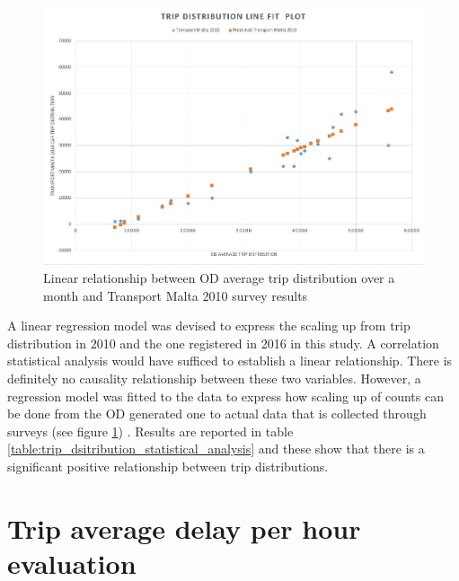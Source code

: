 \documentclass[12pt, a4paper]{report}
\theoremstyle{definition}
\theoremstyle{definition}%
\theoremstyle{definition}%
\theoremstyle{definition}%
\theoremstyle{definition}%
\theoremstyle{definition}%
\begin{document}
\begin{figure}[!]	
	\includegraphics[scale=0.6]{Trip_distribution_line_fit_plot.jpg}
	\centering
	\caption[NHTS and OD average trip distribution linear relationship]{Linear relationship between OD average trip distribution over a month and Transport Malta 2010 survey results \cite{malta2011national}}
	\label{fig:trip_count_correlation_model}
\end{figure}

A linear regression model was devised to express the scaling up from trip distribution in 2010 and the one registered in 2016 in this study. A correlation statistical analysis would have sufficed to establish a linear relationship. There is definitely no causality relationship between these two variables. However, a regression model was fitted to the data to express how scaling up of counts can be done from the OD generated one to actual data that is collected through surveys (see figure \ref{fig:trip_count_correlation_model}) . Results are reported in table \ref{table:trip_dsitribution_statistical_analysis} and these show that there is a significant positive relationship between trip distributions.


\section{Trip average delay per hour evaluation} \label{section:trip_average_delay_evaluation}
\end{document}
